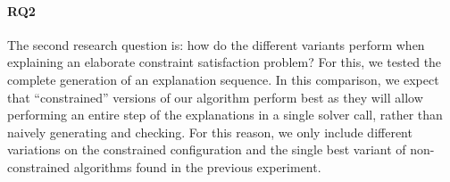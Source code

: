 

\paragraph{RQ2}
The second research question is: how do the different variants perform when explaining an elaborate constraint satisfaction problem? For this, we tested the complete generation of an explanation sequence. 
In this comparison, we expect that ``constrained'' versions of our algorithm perform best as they will allow performing an entire step of the explanations in a single solver call, rather than naively generating and checking. 
For this reason, we only include different variations on the constrained configuration and the single best variant of non-constrained algorithms found in the previous experiment. 


